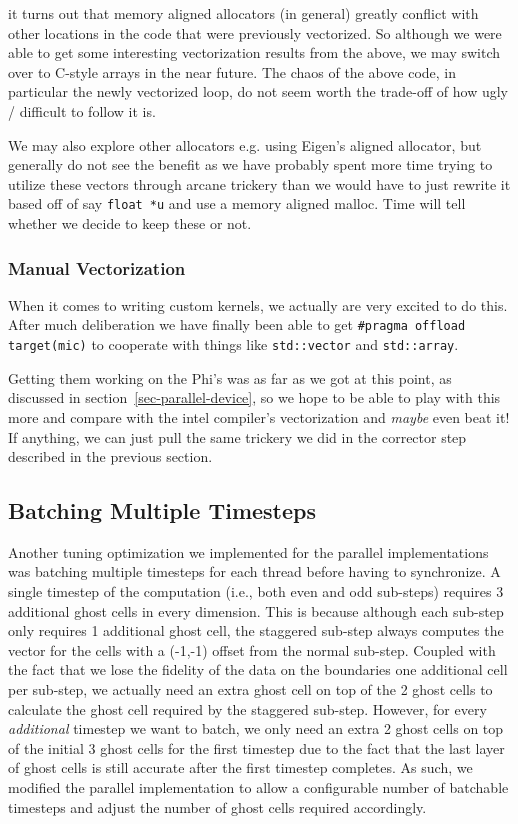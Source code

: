 \noindent it turns out that memory aligned allocators (in general) greatly conflict with other locations in the code that were previously vectorized.  So although we were able to get some interesting vectorization results from the above, we may switch over to C-style arrays in the near future.  The chaos of the above code, in particular the newly vectorized loop, do not seem worth the trade-off of how ugly / difficult to follow it is.

We may also explore other allocators e.g. using Eigen's aligned allocator, but generally do not see the benefit as we have probably spent more time trying to utilize these vectors through arcane trickery than we would have to just rewrite it based off of say \texttt{float *u} and use a memory aligned malloc.  Time will tell whether we decide to keep these or not.

\subsubsection{Manual Vectorization}
\label{sec-tune-vectorizing-manual-vectorization}

When it comes to writing custom kernels, we actually are very excited to do this.  After much deliberation we have finally been able to get \texttt{\#pragma offload target(mic)} to cooperate with things like \texttt{std::vector} and \texttt{std::array}.

Getting them working on the Phi's was as far as we got at this point, as discussed in section~\ref{sec-parallel-device}, so we hope to be able to play with this more and compare with the intel compiler's vectorization and \emph{maybe} even beat it!  If anything, we can just pull the same trickery we did in the corrector step described in the previous section.

\subsection{Batching Multiple Timesteps}
\label{sec-tune-batching}

Another tuning optimization we implemented for the parallel
implementations was batching multiple timesteps for each thread before
having to synchronize. A single timestep of the computation (i.e., both
even and odd sub-steps) requires 3 additional ghost cells in every
dimension. This is because although each sub-step only requires 1
additional ghost cell, the staggered sub-step always computes the vector
for the cells with a (-1,-1) offset from the normal sub-step. Coupled
with the fact that we lose the fidelity of the data on the boundaries one
additional cell per sub-step, we actually need an extra ghost cell on top
of the 2 ghost cells to calculate the ghost cell required by the
staggered sub-step. However, for every \emph{additional} timestep we want
to batch, we only need an extra 2 ghost cells on top of the initial 3
ghost cells for the first timestep due to the fact that the last layer of
ghost cells is still accurate after the first timestep completes. As
such, we modified the parallel implementation to allow a configurable
number of batchable timesteps and adjust the number of ghost cells
required accordingly.

